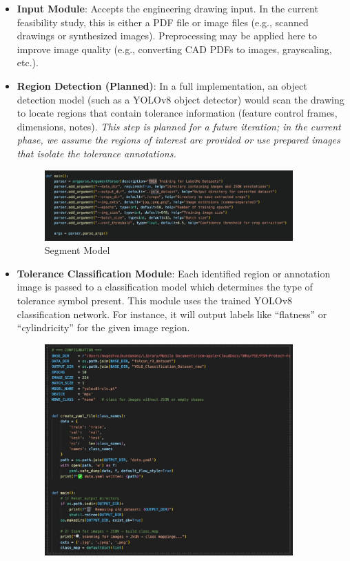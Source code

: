 \documentclass[11pt,a4paper]{article}
\begin{document}
\begin{itemize}
  \item \textbf{Input Module}: Accepts the engineering drawing input. In the current feasibility study, this is either a PDF file or image files (e.g., scanned drawings or synthesized images). Preprocessing may be applied here to improve image quality (e.g., converting CAD PDFs to images, grayscaling, etc.).
  \item \textbf{Region Detection (Planned)}: In a full implementation, an object detection model (such as a YOLOv8 object detector) would scan the drawing to locate regions that contain tolerance information (feature control frames, dimensions, notes). \emph{This step is planned for a future iteration; in the current phase, we assume the regions of interest are provided or use prepared images that isolate the tolerance annotations.}
  \begin{figure}[h!]
  \centering
  \includegraphics[width=0.9\textwidth]{Segment_Model.png}
  \caption{Segment Model}
  \end{figure}
  \item \textbf{Tolerance Classification Module}: Each identified region or annotation image is passed to a classification model which determines the type of tolerance symbol present. This module uses the trained YOLOv8 classification network. For instance, it will output labels like “flatness” or “cylindricity” for the given image region.
\begin{figure}[h!]
\centering
\includegraphics[width=0.9\textwidth]{Classification_Model.png}

\end{figure}
\end{itemize}
\end{document}

